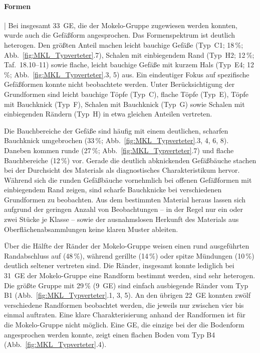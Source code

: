\paragraph{Formen}\hspace{-.5em}|\hspace{.5em}%
Bei insgesamt 33~GE, die der Mokelo-Gruppe zugewiesen werden konnten, wurde auch die Gefäßform angesprochen. Das Formenspektrum ist deutlich heterogen. Den größten Anteil machen leicht bauchige Gefäße (Typ~C1; 18\,\%; Abb.~\ref{fig:MKL_Typverteter}.7), Schalen mit einbiegendem Rand (Typ~H2; 12\,\%; Taf.~18.10--11) sowie flache, leicht bauchige Gefäße mit kurzem Hals (Typ~E4; 12\,\%; Abb.~\ref{fig:MKL_Typverteter}.3, 5) aus. Ein eindeutiger Fokus auf spezifische Gefäßformen konnte nicht beobachtete werden. Unter Berücksichtigung der Grundformen sind leicht bauchige Töpfe (Typ~C), flache Töpfe (Typ~E), Töpfe mit Bauchknick (Typ~F), Schalen mit Bauchknick (Typ~G) sowie Schalen mit einbiegenden Rändern (Typ~H) in etwa gleichen Anteilen vertreten.

Die Bauchbereiche der Gefäße sind häufig mit einem deutlichen, scharfen Bauchknick  umgebrochen (33\,\%; Abb.~\ref{fig:MKL_Typverteter}.3, 4, 6, 8). Daneben kommen runde (27\,\%; Abb.~\ref{fig:MKL_Typverteter}.7) und flache Bauchbereiche (12\,\%) vor. Gerade die deutlich abknickenden Gefäßbäuche stachen bei der Durchsicht des Materials als diagnostisches Charakteristikum hervor. Während sich die runden Gefäßbäuche vornehmlich bei offenen Gefäßformen mit einbiegendem Rand zeigen, sind scharfe Bauchknicke bei verschiedenen Grundformen zu beobachten. Aus dem bestimmten Material heraus lassen sich aufgrund der geringen Anzahl von Beobachtungen -- in der Regel nur ein oder zwei Stücke je Klasse -- sowie der ausnahmslosen Herkunft des Materials aus Oberflächenabsammlungen keine klaren Muster ableiten.

Über die Hälfte der Ränder der Mokelo-Gruppe weisen einen rund ausgeführten Randabschluss auf (48\,\%), während gerillte (14\,\%) oder spitze Mündungen (10\,\%) deutlich seltener vertreten sind. Die Ränder, insgesamt konnte lediglich bei 31~GE der Mokelo-Gruppe eine Randform bestimmt werden, sind sehr heterogen. Die größte Gruppe mit 29\,\% (9~GE) sind einfach ausbiegende Ränder vom Typ B1 (Abb.~\ref{fig:MKL_Typverteter}.1, 3, 5). An den übrigen 22~GE konnten zwölf verschiedene Randformen beobachtet werden, die jeweils nur zwischen vier bis einmal auftraten. Eine klare Charakterisierung anhand der Randformen ist für die Mokelo-Gruppe nicht möglich. Eine GE, die einzige bei der die Bodenform angesprochen werden konnte, zeigt einen flachen Boden vom Typ B4 (Abb.~\ref{fig:MKL_Typverteter}.4).


